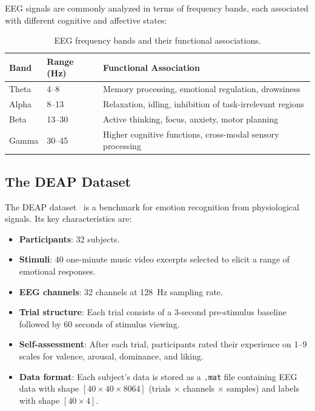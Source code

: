 \documentclass[12pt,a4paper]{report}
\begin{document}
EEG signals are commonly analyzed in terms of frequency bands, each associated
with different cognitive and affective states:

\begin{table}[H]
\centering
\caption{EEG frequency bands and their functional associations.}
\label{tab:eeg_bands}
\begin{tabular}{llp{7cm}}
\toprule
\textbf{Band} & \textbf{Range (Hz)} & \textbf{Functional Association} \\
\midrule
Theta  & 4--8   & Memory processing, emotional regulation, drowsiness \\
Alpha  & 8--13  & Relaxation, idling, inhibition of task-irrelevant regions \\
Beta   & 13--30 & Active thinking, focus, anxiety, motor planning \\
Gamma  & 30--45 & Higher cognitive functions, cross-modal sensory processing \\
\bottomrule
\end{tabular}
\end{table}

\subsection{The DEAP Dataset}

The DEAP dataset~\cite{koelstra2012deap} is a benchmark for emotion
recognition from physiological signals. Its key characteristics are:

\begin{itemize}[noitemsep]
    \item \textbf{Participants}: 32 subjects.
    \item \textbf{Stimuli}: 40 one-minute music video excerpts selected to
          elicit a range of emotional responses.
    \item \textbf{EEG channels}: 32 channels at 128~Hz sampling rate.
    \item \textbf{Trial structure}: Each trial consists of a 3-second
          pre-stimulus baseline followed by 60 seconds of stimulus viewing.
    \item \textbf{Self-assessment}: After each trial, participants rated their
          experience on 1--9 scales for valence, arousal, dominance, and liking.
    \item \textbf{Data format}: Each subject's data is stored as a
          \texttt{.mat} file containing EEG data with shape
          $[40 \times 40 \times 8064]$ (trials $\times$ channels $\times$
          samples) and labels with shape $[40 \times 4]$.
\end{itemize}
\end{document}
